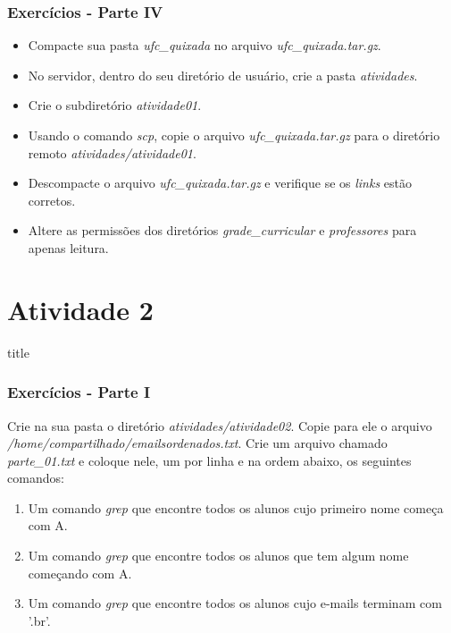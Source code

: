 \documentclass{beamer}
\begin{document}
   \begin{frame}
      \frametitle{Exercícios - Parte IV}
      
      \begin{itemize}
         \item Compacte sua pasta \textit{ufc\_quixada} no arquivo \textit{ufc\_quixada.tar.gz}.
	 \item No servidor, dentro do seu diretório de usuário, crie a pasta \textit{atividades}.
	 \item Crie o subdiretório \textit{atividade01}.
         \item Usando o comando \textit{scp}, copie o arquivo \textit{ufc\_quixada.tar.gz} para o diretório remoto \textit{atividades/atividade01}. 
         \item Descompacte o arquivo \textit{ufc\_quixada.tar.gz} e verifique se os \textit{links} estão corretos.
         \item Altere as permissões dos diretórios \textit{grade\_curricular} e \textit{professores} para apenas leitura.
      \end{itemize}
   \end{frame}
 
\section{Atividade 2}

   \begin{frame}
      \begin{beamercolorbox}[sep=8pt,center,shadow=true,rounded=true]{title}
      \insertsectionhead\par%
      \end{beamercolorbox}
   \end{frame}

   \begin{frame}
      \frametitle{Exercícios - Parte I}
      Crie na sua pasta o diretório \textit{atividades/atividade02}. Copie para ele o arquivo \textit{/home/compartilhado/emailsordenados.txt}. Crie um arquivo chamado \textit{parte\_01.txt} e coloque nele, um por linha e na ordem abaixo, os seguintes comandos:
      \begin{enumerate}
         \item Um comando \textit{grep} que encontre todos os alunos cujo primeiro nome começa com A.
	 \item Um comando \textit{grep} que encontre todos os alunos que tem algum nome começando com A.
	 \item Um comando \textit{grep} que encontre todos os alunos cujo e-mails terminam com '.br'.
      \end{enumerate}
   \end{frame}
\end{document}
